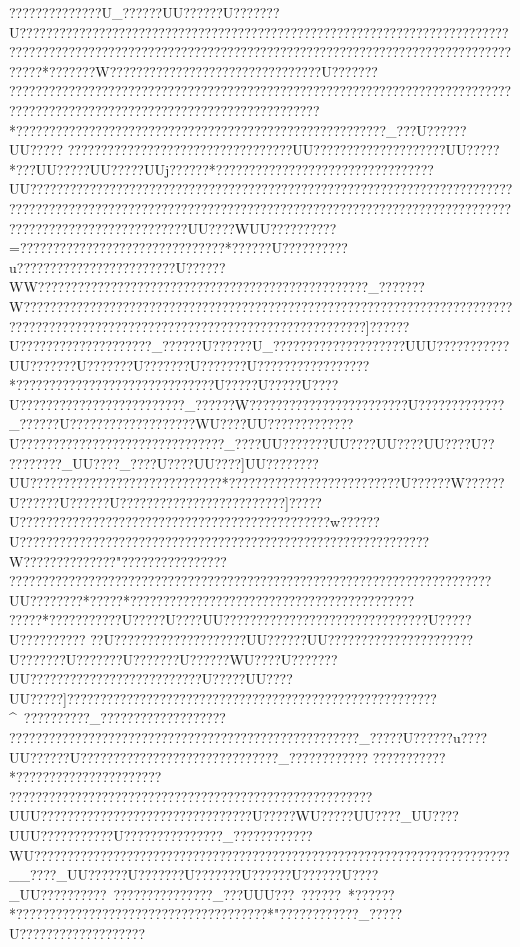 {{{{{{{{{{{{{{{{{{{{{{{{{{{{{{{{{{{{{{{{{{{{{{{{{{{{{{{{{{{{{{{{{{{{{{{{{{{{{{{{{{{{{{{{{{{{{{{{{{{{{{{{{{{{{{{{{{{{{{{{{{{{{{{{{{{{{{{{{{{{{{{{{{{{{{{{{{{{??????????????U_??????UU??????U???????U????????????????????????????????????????????????????????????????????????????????????????  ??????  ??????  ??????? ????????????????????????????????????????????????*???????W????????????????????????????????U???????
????????????????????????????????????{???????????????????????????????????????????????????????????????????????????????????????*????????????????????????????????????????????????????????_???U??????UU?????   ??? ???????????????????????????????UU??????? ??????? ??????UU?????*  ???UU?????UU?????UUj??????*  ?????  ?????   ?????   ?????   ?????   ???  ?????UU?????  ????? ?????????????????????????????????????????????????? ????????????????????????????????????????????????????????????????????????????????????????????????????????????????????UU????WUU??   ????????=?  ???????  ??  ?????????????????????*??????U??????????u?????? ??????????????????U??????WW?????? ?????? ??????????????????????????????????????_???????W??????? ?????? ???????????????????????????????????????????????????????????????????????????????????????????????????????????????????]??????U????????????????????_??????U??????U_?????  ?????  ????   ??????UUU?????   ??????UU???????U???????U???????U???????U??????????? ??????  *??????????????????????????????U?????U?????U????}U??????????  ????  ????  ???????_??????W????  ??????  ?????? ????????U?????????????_??????U???  ????? ????? ??????WU????UU?????????????U??? ????????????????????????????_????UU???   ????UU????UU????UU????U??  
?????  ???_UU?? ??_????U????UU????]UU???   ?????UU?????????????????????????????*??????}????????????????????U??????W??????U??????U??????U?????????????????????????]?????U???????????????????????????????????????????????w??????U???????????????????????????????????????? ?????? ????????????????W????????? ????? "???? ????? ?????????? ?????? ???????  ????????????  ?????  ??????  ??????????????????????????????????UU????????*????? *????  ???? ????? ??????????????????????????????
?????*????  ???????U?????U????UU?????????? ?????????????????????U?????U??????????
??U?? ?????  ?????????????UU??????UU??????????????????????U???????U???????U???????U??????WU????U?  ??????UU????????????????? ?????????U?????UU????UU?????]????????????????????????????????????????????????????????^~??????????_????????????? ??????
?????????????????????????????????????????????????????_?????U??????u????UU??????U????  ??????????????????????????_????????????
?????? ?????*?????????????????????????????? ??????????? ???????????????????????????????   ?????UUU????   ????  ?????  ????? ?????? ?????? ??U?????WU?????UU????_UU????UUU??  ???? ?????U???????????????_????????????WU?????????? ??????????????????????????????????????????????????????????????__????_UU??????U???????U???????U??????U??????U????_UU??????????~?????????  ??????_???UUU???~??????~*??????*??????????????????????????????????????*"  ????????????_?????U?????? ?????????????  
}}}}}}}}}}}}}}}}}}}}}}}}}}}}}}}}}}}}}}}}}}}}}}}}}}}}}}}}}}}}}}}}}}}}}}}}}}}}}}}}}}}}}}}}}}}}}}}}}}}}}}}}}}}}}}}}}}}}}}}}}}}}}}}}}}}}}}}}}}}}}}}}}}}}}}}}}}}

